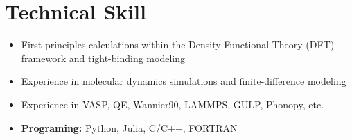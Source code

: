 \section{Technical Skill}\label{technical-skill}

\begin{itemize}
\tightlist
\item
  First-principles calculations within the Density Functional Theory
  (DFT) framework and tight-binding modeling
\item
  Experience in molecular dynamics simulations and finite-difference
  modeling
\item
  Experience in VASP, QE, Wannier90, LAMMPS, GULP, Phonopy, etc.
\item
  \textbf{Programing:} Python, Julia, C/C++, FORTRAN
\end{itemize}
